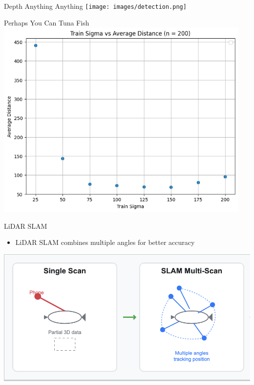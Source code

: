 \begin{frame}{Depth Anything Anything}
    \centering
    \texttt{[image: images/detection.png]}
\end{frame}

\begin{frame}{Perhaps You Can Tuna Fish}
    \centering
    \includegraphics[height=0.95\textheight,width=0.95\textwidth,keepaspectratio]{images/tuning.png}
\end{frame}

\begin{frame}{LiDAR SLAM}
    \begin{itemize}
        \item LiDAR SLAM combines multiple angles for better accuracy
    \end{itemize}

    \centering
    \includegraphics[height=0.7\textheight,keepaspectratio]{images/LiDAR SLAM.png}
\end{frame}
